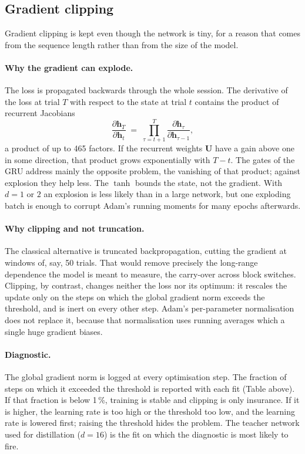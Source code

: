 \documentclass[11pt,a4paper]{article}
\newcommand{\vect}[1]{\bm{#1}}
\begin{document}
\subsection{Gradient clipping}
\label{sec:clip}

Gradient clipping is kept even though the network is tiny, for a reason that comes from
the sequence length rather than from the size of the model.

\paragraph{Why the gradient can explode.} The loss is propagated backwards through the
whole session. The derivative of the loss at trial $T$ with respect to the state at
trial $t$ contains the product of recurrent Jacobians
\begin{equation}
  \frac{\partial \vect{h}_T}{\partial \vect{h}_t}
  \;=\; \prod_{\tau = t+1}^{T} \frac{\partial \vect{h}_\tau}{\partial \vect{h}_{\tau-1}},
  \label{eq:jac}
\end{equation}
a product of up to 465 factors. If the recurrent weights $\vect{U}$ have a gain above
one in some direction, that product grows exponentially with $T - t$. The gates of the
GRU address mainly the opposite problem, the vanishing of that product; against
explosion they help less. The $\tanh$ bounds the state, not the gradient. With $d = 1$
or $2$ an explosion is less likely than in a large network, but one exploding batch is
enough to corrupt Adam's running moments for many epochs afterwards.

\paragraph{Why clipping and not truncation.} The classical alternative is truncated
backpropagation, cutting the gradient at windows of, say, 50 trials. That would remove
precisely the long-range dependence the model is meant to measure, the carry-over across
block switches. Clipping, by contrast, changes neither the loss nor its optimum: it
rescales the update only on the steps on which the global gradient norm exceeds the
threshold, and is inert on every other step. Adam's per-parameter normalisation does not
replace it, because that normalisation uses running averages which a single huge
gradient biases.

\paragraph{Diagnostic.} The global gradient norm is logged at every optimisation step.
The fraction of steps on which it exceeded the threshold is reported with each fit
(Table above). If that fraction is below 1\,\%, training is stable and clipping is only
insurance. If it is higher, the learning rate is too high or the threshold too low, and
the learning rate is lowered first; raising the threshold hides the problem. The teacher
network used for distillation ($d = 16$) is the fit on which the diagnostic is most
likely to fire.
\end{document}
